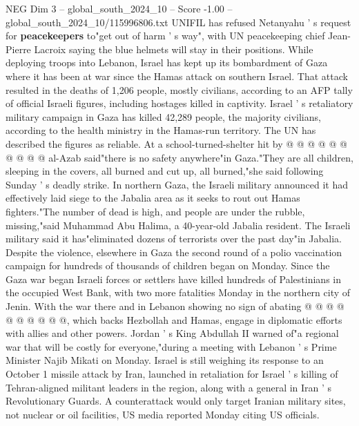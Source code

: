 \begin{textsample}{NEG Dim 3 – global\_south\_2024\_10 – Score -1.00 – global\_south\_2024\_10/115996806.txt}
UNIFIL has refused Netanyahu ' s request for \textbf{peacekeepers} to"get out of harm ' s way", with UN peacekeeping chief Jean-Pierre Lacroix saying the blue helmets will stay in their positions.
While deploying troops into Lebanon, Israel has kept up its bombardment of Gaza where it has been at war since the Hamas attack on southern Israel.
That attack resulted in the deaths of 1,206 people, mostly civilians, according to an AFP tally of official Israeli figures, including hostages killed in captivity.
Israel ' s retaliatory military campaign in Gaza has killed 42,289 people, the majority civilians, according to the health ministry in the Hamas-run territory.
The UN has described the figures as reliable.
At a school-turned-shelter hit by @ @ @ @ @ @ @ @ @ @ al-Azab said"there is no safety anywhere"in Gaza."They are all children, sleeping in the covers, all burned and cut up, all burned,"she said following Sunday ' s deadly strike.
In northern Gaza, the Israeli military announced it had effectively laid siege to the Jabalia area as it seeks to rout out Hamas fighters."The number of dead is high, and people are under the rubble, missing,"said Muhammad Abu Halima, a 40-year-old Jabalia resident.
The Israeli military said it has"eliminated dozens of terrorists over the past day"in Jabalia.
Despite the violence, elsewhere in Gaza the second round of a polio vaccination campaign for hundreds of thousands of children began on Monday.
Since the Gaza war began Israeli forces or settlers have killed hundreds of Palestinians in the occupied West Bank, with two more fatalities Monday in the northern city of Jenin.
With the war there and in Lebanon showing no sign of abating @ @ @ @ @ @ @ @ @ @, which backs Hezbollah and Hamas, engage in diplomatic efforts with allies and other powers.
Jordan ' s King Abdullah II warned of"a regional war that will be costly for everyone,"during a meeting with Lebanon ' s Prime Minister Najib Mikati on Monday.
Israel is still weighing its response to an October 1 missile attack by Iran, launched in retaliation for Israel ' s killing of Tehran-aligned militant leaders in the region, along with a general in Iran ' s Revolutionary Guards.
A counterattack would only target Iranian military sites, not nuclear or oil facilities, US media reported Monday citing US officials.

\end{textsample}
